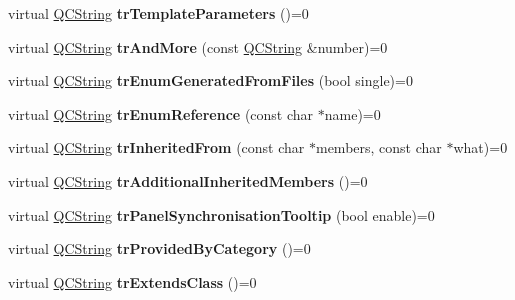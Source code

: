 \begin{DoxyCompactItemize}
\item 
\hypertarget{class_translator_a59d44f0cb71f3e509e1eefdb350e1065}{virtual \hyperlink{class_q_c_string}{Q\-C\-String} {\bfseries tr\-Template\-Parameters} ()=0}\label{class_translator_a59d44f0cb71f3e509e1eefdb350e1065}

\item 
\hypertarget{class_translator_aa0a1d1e2e2e623550e2310fbd138bdc7}{virtual \hyperlink{class_q_c_string}{Q\-C\-String} {\bfseries tr\-And\-More} (const \hyperlink{class_q_c_string}{Q\-C\-String} \&number)=0}\label{class_translator_aa0a1d1e2e2e623550e2310fbd138bdc7}

\item 
\hypertarget{class_translator_af140afa60a39765ffaaf0b2f4ff7c10c}{virtual \hyperlink{class_q_c_string}{Q\-C\-String} {\bfseries tr\-Enum\-Generated\-From\-Files} (bool single)=0}\label{class_translator_af140afa60a39765ffaaf0b2f4ff7c10c}

\item 
\hypertarget{class_translator_a14f8fa7fbfb861ab29f4951d742ab00f}{virtual \hyperlink{class_q_c_string}{Q\-C\-String} {\bfseries tr\-Enum\-Reference} (const char $\ast$name)=0}\label{class_translator_a14f8fa7fbfb861ab29f4951d742ab00f}

\item 
\hypertarget{class_translator_a6828b986a4ba3231c9f0d29c60ff8ad7}{virtual \hyperlink{class_q_c_string}{Q\-C\-String} {\bfseries tr\-Inherited\-From} (const char $\ast$members, const char $\ast$what)=0}\label{class_translator_a6828b986a4ba3231c9f0d29c60ff8ad7}

\item 
\hypertarget{class_translator_a20a4ee24c1e186cf2d1349e514282482}{virtual \hyperlink{class_q_c_string}{Q\-C\-String} {\bfseries tr\-Additional\-Inherited\-Members} ()=0}\label{class_translator_a20a4ee24c1e186cf2d1349e514282482}

\item 
\hypertarget{class_translator_a3fd9dc8885058be38345e840a5f534bd}{virtual \hyperlink{class_q_c_string}{Q\-C\-String} {\bfseries tr\-Panel\-Synchronisation\-Tooltip} (bool enable)=0}\label{class_translator_a3fd9dc8885058be38345e840a5f534bd}

\item 
\hypertarget{class_translator_a84b6f6c04b8216e616e1f947a75ba7d8}{virtual \hyperlink{class_q_c_string}{Q\-C\-String} {\bfseries tr\-Provided\-By\-Category} ()=0}\label{class_translator_a84b6f6c04b8216e616e1f947a75ba7d8}

\item 
\hypertarget{class_translator_a80a318bbf402354580fd0fb6d480a192}{virtual \hyperlink{class_q_c_string}{Q\-C\-String} {\bfseries tr\-Extends\-Class} ()=0}\label{class_translator_a80a318bbf402354580fd0fb6d480a192}


\end{DoxyCompactItemize}
